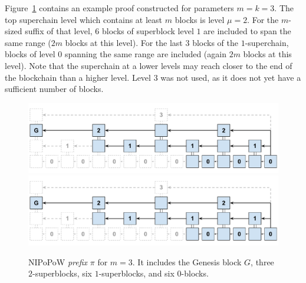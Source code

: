 Figure~\ref{fig.nipopow} contains an example proof constructed for parameters
$m = k = 3$. The top superchain level which contains at least $m$ blocks is
level $\mu = 2$. For the $m$-sized suffix of that level, $6$ blocks of
superblock level $1$ are included to span the same range ($2m$ blocks at this
level). For the last $3$ blocks of the $1$-superchain, blocks of level $0$
spanning the same range are included (again $2m$ blocks at this level). Note
that the superchain at a lower levels may reach closer to the end of the
blockchain than a higher level. Level $3$ was not used, as it does not yet have
a sufficient number of blocks.

\begin{figure}[h]
    \caption{
    NIPoPoW \emph{prefix} $\pi$ for $m = 3$. It includes the Genesis block $G$,
    three $2$-superblocks, six $1$-superblocks, and six $0$-blocks.
    }
    \centering
    \iftwocolumn
        \includegraphics[width=0.9\columnwidth,keepaspectratio]{figures/non-interactive-popow.pdf}
    \else
        \includegraphics[width=0.7\columnwidth,keepaspectratio]{figures/non-interactive-popow.pdf}
    \fi
    \label{fig.nipopow}
\end{figure}

